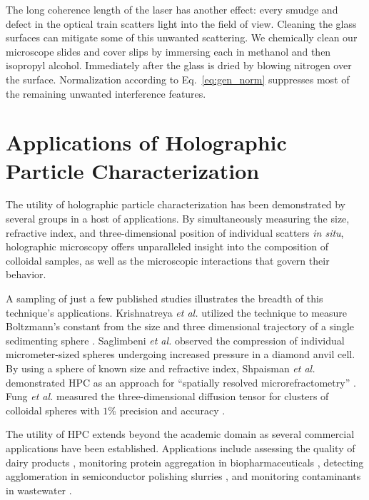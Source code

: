 The long coherence length of the laser has another effect: every
smudge and defect in the optical train scatters light into the field of view. Cleaning
the glass surfaces can mitigate some of this unwanted scattering.
We chemically clean our microscope slides and cover slips
by immersing each in methanol and then isopropyl alcohol. Immediately
after the glass is dried by blowing nitrogen over the surface.
Normalization according to Eq.~\ref{eq:gen_norm} suppresses most of the remaining
unwanted interference features.

\section{Applications of Holographic Particle Characterization}

The utility of holographic particle characterization has been demonstrated by several groups
in a host of applications\cite{lee07a,fung12,saglimbeni16}. By simultaneously measuring the size, refractive index,
and three-dimensional position of individual scatters {\it in situ}, holographic
microscopy offers unparalleled insight into the composition of colloidal samples, as well
as the microscopic interactions that govern their behavior.

A sampling of just a few published studies illustrates the breadth of this technique's
applications.
Krishnatreya \emph{et al.} utilized the technique to measure Boltzmann's constant from the
size and three dimensional trajectory of a single sedimenting sphere \cite{krishnatreya14}.
Saglimbeni \emph{et al.} observed the compression of individual micrometer-sized
spheres
undergoing increased pressure in a diamond anvil cell\cite{saglimbeni16}. By using a sphere
of known size and refractive index, Shpaisman \emph{et al.} demonstrated HPC as an
approach for ``spatially resolved microrefractometry'' \cite{shpaisman12}.
Fung \emph{et al.} measured the three-dimensional diffusion tensor for
clusters of colloidal spheres with $\num{1}$\% precision and accuracy \cite{fung13}.

The utility of HPC extends beyond the academic domain as several commercial
applications have been established. Applications include assessing the quality of dairy
products \cite{cheong09a}, monitoring protein aggregation in biopharmaceuticals \cite{wang16}, detecting agglomeration in semiconductor polishing slurries \cite{cheong17}, 
and monitoring contaminants in wastewater \cite{philips17}.
%
%
%
%

%

